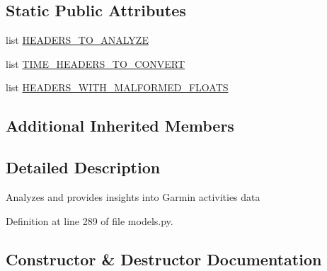 \subsection*{Static Public Attributes}
\begin{DoxyCompactItemize}
\item 
list \hyperlink{classpygce_1_1analysis_1_1models_1_1_activities_data_analysis_a799ad90125cc686b985fe525a3b33062}{H\+E\+A\+D\+E\+R\+S\+\_\+\+T\+O\+\_\+\+A\+N\+A\+L\+Y\+ZE}
\item 
list \hyperlink{classpygce_1_1analysis_1_1models_1_1_activities_data_analysis_a2f0ccc7899b8c6b6d94391c80f5def1d}{T\+I\+M\+E\+\_\+\+H\+E\+A\+D\+E\+R\+S\+\_\+\+T\+O\+\_\+\+C\+O\+N\+V\+E\+RT}
\item 
list \hyperlink{classpygce_1_1analysis_1_1models_1_1_activities_data_analysis_a272e010f956a64a8f916ebf1b9e14255}{H\+E\+A\+D\+E\+R\+S\+\_\+\+W\+I\+T\+H\+\_\+\+M\+A\+L\+F\+O\+R\+M\+E\+D\+\_\+\+F\+L\+O\+A\+TS}
\end{DoxyCompactItemize}
\subsection*{Additional Inherited Members}


\subsection{Detailed Description}
\begin{DoxyVerb}Analyzes and provides insights into Garmin activities data \end{DoxyVerb}
 

Definition at line 289 of file models.\+py.



\subsection{Constructor \& Destructor Documentation}
